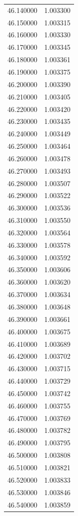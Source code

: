 \begin{tabular}{rr}
46.140000 & 1.003300 \\
46.150000 & 1.003315 \\
46.160000 & 1.003330 \\
46.170000 & 1.003345 \\
46.180000 & 1.003361 \\
46.190000 & 1.003375 \\
46.200000 & 1.003390 \\
46.210000 & 1.003405 \\
46.220000 & 1.003420 \\
46.230000 & 1.003435 \\
46.240000 & 1.003449 \\
46.250000 & 1.003464 \\
46.260000 & 1.003478 \\
46.270000 & 1.003493 \\
46.280000 & 1.003507 \\
46.290000 & 1.003522 \\
46.300000 & 1.003536 \\
46.310000 & 1.003550 \\
46.320000 & 1.003564 \\
46.330000 & 1.003578 \\
46.340000 & 1.003592 \\
46.350000 & 1.003606 \\
46.360000 & 1.003620 \\
46.370000 & 1.003634 \\
46.380000 & 1.003648 \\
46.390000 & 1.003661 \\
46.400000 & 1.003675 \\
46.410000 & 1.003689 \\
46.420000 & 1.003702 \\
46.430000 & 1.003715 \\
46.440000 & 1.003729 \\
46.450000 & 1.003742 \\
46.460000 & 1.003755 \\
46.470000 & 1.003769 \\
46.480000 & 1.003782 \\
46.490000 & 1.003795 \\
46.500000 & 1.003808 \\
46.510000 & 1.003821 \\
46.520000 & 1.003833 \\
46.530000 & 1.003846 \\
46.540000 & 1.003859 \\

\end{tabular}
